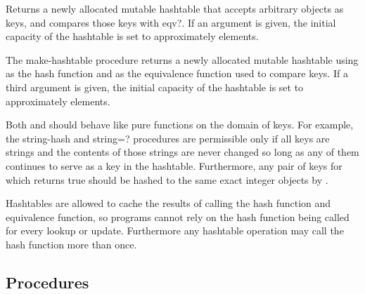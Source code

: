 \begin{entry}{%
}

Returns a newly allocated mutable hashtable that accepts
arbitrary objects as keys,
and compares those keys with {\cf eqv?}.
If an argument is given, the initial 
capacity of the hashtable is set to approximately  elements.

\end{entry}

\begin{entry}{%
}

The {\cf make-hashtable} procedure returns a newly allocated mutable
hashtable using  
as the hash function and  as the equivalence function used to 
compare keys.
If a third argument is given, the 
initial capacity of the hashtable is set to approximately  elements.

Both  and  should behave like pure functions
on the domain of keys.  For example, the {\cf string-hash}
and {\cf string=?} procedures are permissible only if all
keys are strings and the contents of those strings are never
changed so long as any of them continues to serve as a key in
the hashtable.  Furthermore, any pair of keys for which
 returns true should
be hashed to the same exact integer objects by 
.


\begin{note}
Hashtables are allowed to cache the results of calling the
hash function and equivalence function, so programs cannot
rely on the hash function being called for every lookup or
update.  Furthermore any hashtable operation may call the
hash function more than once.
\end{note}

\end{entry}

\subsection{Procedures}

